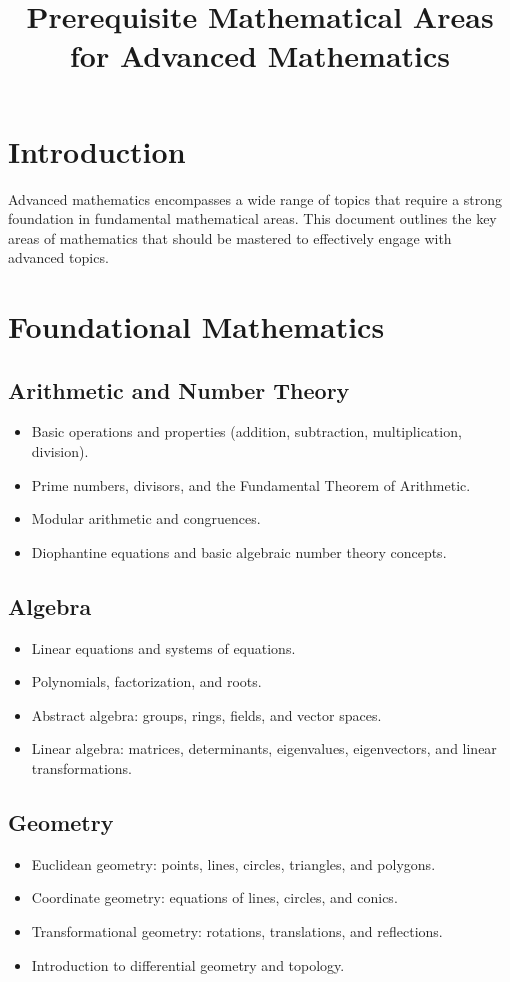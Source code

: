 \documentclass[12pt]{article}
\begin{document}
\title{Prerequisite Mathematical Areas for Advanced Mathematics}
\author{}
\date{}
\maketitle

\section*{Introduction}
Advanced mathematics encompasses a wide range of topics that require a strong foundation in fundamental mathematical areas. This document outlines the key areas of mathematics that should be mastered to effectively engage with advanced topics.

\section{Foundational Mathematics}

\subsection{Arithmetic and Number Theory}
\begin{itemize}
    \item Basic operations and properties (addition, subtraction, multiplication, division).
    \item Prime numbers, divisors, and the Fundamental Theorem of Arithmetic.
    \item Modular arithmetic and congruences.
    \item Diophantine equations and basic algebraic number theory concepts.
\end{itemize}

\subsection{Algebra}
\begin{itemize}
    \item Linear equations and systems of equations.
    \item Polynomials, factorization, and roots.
    \item Abstract algebra: groups, rings, fields, and vector spaces.
    \item Linear algebra: matrices, determinants, eigenvalues, eigenvectors, and linear transformations.
\end{itemize}

\subsection{Geometry}
\begin{itemize}
    \item Euclidean geometry: points, lines, circles, triangles, and polygons.
    \item Coordinate geometry: equations of lines, circles, and conics.
    \item Transformational geometry: rotations, translations, and reflections.
    \item Introduction to differential geometry and topology.
\end{itemize}
\end{document}
